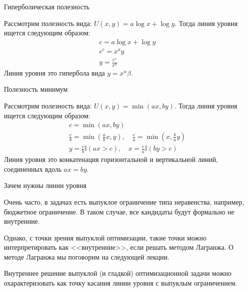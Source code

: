 \documentclass{beamer}
\begin{document}
\begin{frame}{Гиперболическая полезность}

Рассмотрим полезность вида: $U(x, y) = a \log x + \log y$. Тогда линия уровня ищется следующим образом: 
\begin{gather*}
c =  a \log x + \log y\\
e^{c} = x^a y\\
y =\frac{e^{c}}{x^a}
\end{gather*}
Линия уровня это гипербола вида $y = x^\alpha \beta$.

\end{frame}

\begin{frame}{Полезность минимум}

Рассмотрим полезность вида: $U(x, y) = \min(ax, by)$. Тогда линия уровня ищется следующим образом: 
\begin{gather*}
c = \min(ax, by)\\
\frac{c}{b}= \min(\frac{a}{b}x, y), \quad \frac{c}{a}= \min(x, \frac{b}{a}y)\\
y = \frac{c}{b} \mathbb{I}(ax > c), \quad x = \frac{c}{a} \mathbb{I}(by > c)
\end{gather*}
Линия уровня это конкатенация горизонтальной и вертикальной линий, соединенных вдоль $ax = by$.

\end{frame}

\begin{frame}{Зачем нужны линии уровня}

Очень часто, в задачах есть выпуклое ограничение типа неравенства, например, бюджетное ограничение. В таком случае, все кандидаты будут формально не внутренние. 

Однако, с точки зрения выпуклой оптимизации, такие точки можно интерпретировать как <<внутренние>>, если решать методом Лагранжа. О методе Лагранжа мы поговорим на следующей лекции.

Внутреннее решение выпуклой (и гладкой) оптимизационной задачи можно охарактеризовать как точку касания линии уровня с выпуклым ограничением.

\end{frame}
\end{document}
